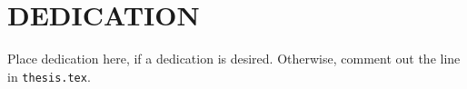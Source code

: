 
\chapter*{DEDICATION}

Place dedication here, if a dedication is desired.
Otherwise, comment out the line
\verb++
in \verb+thesis.tex+.